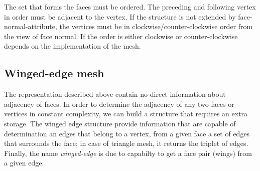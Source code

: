 The set that forms the faces must be ordered. The preceding and following vertex in order must be 
adjacent to
the vertex. If the structure is not extended by face-normal-attribute, the vertices must be in 
clockwise/counter-clockwise order from the view of face normal. If the order is either clockwise or counter-clockwise
depends on the implementation of the mesh.

\subsection{Winged-edge mesh}

The representation described above contain no direct information about adjacency of faces. 
In order to determine the adjacency of any two faces or vertices in constant complexity, we
can build a structure that requires an extra storage. The winged edge structure\cite{Baumgart1972}
provide information
that are capable of determination an edges that belong to a vertex, from a given face a set
of edges that surrounds the face; in case of triangle mesh, it returns the triplet of edges.
Finally, the name \emph{winged-edge} is due to capabilty to get a face pair (wings) from
a given edge.

